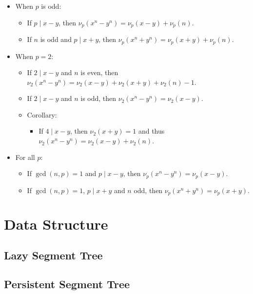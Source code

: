\documentclass[9pt,landscape,a4paper,twocolumn]{extarticle}
\begin{document}
\begin{itemize}
    \item When $p$ is odd:
    \begin{itemize}
        \item If $p \mid x-y$, then $\nu_p(x^n-y^n) = \nu_p(x-y)+\nu_p(n)$.
        \item If $n$ is odd and $p \mid x+y$, then $\nu_p(x^n+y^n) = \nu_p(x+y)+\nu_p(n)$.
    \end{itemize}
    \item When $p = 2$:
    \begin{itemize}
        \item If $2 \mid x-y$ and $n$ is even, then $\nu_2(x^n-y^n) = \nu_2(x-y)+\nu_2(x+y)+\nu_2(n)-1$.
        \item If $2 \mid x-y$ and $n$ is odd, then $\nu_2(x^n-y^n) = \nu_2(x-y)$.
        \item Corollary:
        \begin{itemize}
            \item If $4 \mid x-y$, then $\nu_2(x+y)=1$ and thus $\nu_2(x^n-y^n) = \nu_2(x-y)+\nu_2(n)$.
        \end{itemize}
    \end{itemize}
    \item For all $p$:
    \begin{itemize}
        \item If $\gcd(n,p) = 1$ and $p \mid x-y$, then $\nu_p(x^n-y^n) = \nu_p(x-y)$.
        \item If $\gcd(n,p) = 1$, $p \mid x+y$ and $n$ odd, then $\nu_p(x^n+y^n) = \nu_p(x+y)$.
    \end{itemize}
\end{itemize}

\section{Data Structure}
\subsection{Lazy Segment Tree}


\subsection{Persistent Segment Tree}

\end{document}
